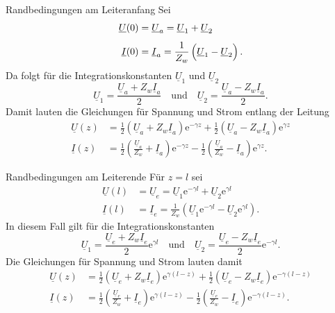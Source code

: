 \documentclass{beamer}
\begin{document}
\begin{frame}{Randbedingungen am Leiteranfang}
Sei
\begin{align*}
    \underline{U}(0) &= \underline{U}_{a} = \underline{U}_{1} + \underline{U}_{2} \\[1ex]
    \underline{I}(0) &= \underline{I}_{a} = \frac{1}{Z_{w}}
    \left(
    \vphantom{\sqrt{1}{Z_{w}}}
    \underline{U}_{1} - \underline{U}_{2} \right).
\end{align*}
Da folgt für die Integrationskonstanten $\underline{U}_{1}$ und $\underline{U}_{2}$
\[ \underline{U}_{1} = \frac{\underline{U}_{a} + Z_{w} \underline{I}_{a}}{2} \quad \text{und} \quad \underline{U}_{2} =
\frac{\underline{U}_{a} - Z_{w} \underline{I}_{a}}{2}. \]
Damit lauten die Gleichungen für Spannung und Strom entlang der Leitung
\begin{align}
    \underline{U}(z) &=
    \frac{1}{2} \left( \underline{U}_{a} + Z_{w} \underline{I}_{a} \right) \mathrm{e}^{- \gamma z}
    +
    \frac{1}{2} \left( \underline{U}_{a} - Z_{w} \underline{I}_{a} \right) \mathrm{e}^{\gamma z} \label{eq:UxA} \\[1ex]
    \underline{I}(z) &=
    \frac{1}{2} \left( \frac{\underline{U}_{a}}{Z_{w}} + \underline{I}_{a} \right) \mathrm{e}^{- \gamma z}
    -
    \frac{1}{2} \left( \frac{\underline{U}_{a}}{Z_{w}} - \underline{I}_{a} \right) \mathrm{e}^{\gamma z} \label{eq:IxA}
    .
\end{align}

\end{frame}



\begin{frame}{Randbedingungen am Leiterende}
Für $z=l$ sei
\begin{align*}
    \underline{U}(l) &= \underline{U}_{e} = \underline{U}_{1} \mathrm{e}^{- \gamma l}
    +
    \underline{U}_{2} \mathrm{e}^{ \gamma l} \\[1ex]
    \underline{I}(l) &= \underline{I}_{e} = \frac{1}{Z_{w}}
    \left(
    \underline{U}_{1} \mathrm{e}^{- \gamma l}
    -
    \underline{U}_{2} \mathrm{e}^{ \gamma l}
    \right).
\end{align*}
In diesem Fall gilt für die Integrationskonstanten
\[ \underline{U}_{1} = \frac{\underline{U}_{e} + Z_{w} \underline{I}_{e}}{2} \mathrm{e}^{\gamma l} \quad \text{und}
\quad \underline{U}_{2} = \frac{\underline{U}_{e} - Z_{w} \underline{I}_{e}}{2} \mathrm{e}^{- \gamma l}. \]
Die Gleichungen für Spannung und Strom lauten damit
\begin{align}
    \underline{U}(z) &=
    \frac{1}{2} \left( \underline{U}_{e} + Z_{w} \underline{I}_{e} \right) \mathrm{e}^{\gamma (l - z)}
    +
    \frac{1}{2} \left( \underline{U}_{e} - Z_{w} \underline{I}_{e} \right) \mathrm{e}^{- \gamma (l - z)} \label{eq:UxE}
    \\[1ex]
    \underline{I}(z) &=
    \frac{1}{2} \left( \frac{\underline{U}_{e}}{Z_{w}} + \underline{I}_{e} \right) \mathrm{e}^{\gamma (l - z)}
    -
    \frac{1}{2} \left( \frac{\underline{U}_{e}}{Z_{w}} - \underline{I}_{e} \right) \mathrm{e}^{- \gamma (l - z)}
    \label{eq:IxE} .
\end{align}

\end{frame}
\end{document}
